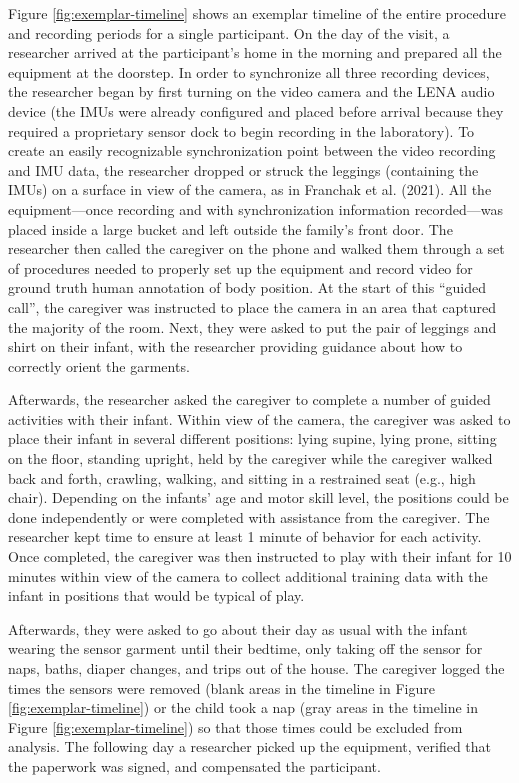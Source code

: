 \documentclass[
  man]{apa6}
\begin{document}
Figure \ref{fig:exemplar-timeline} shows an exemplar timeline of the entire procedure and recording periods for a single participant. On the day of the visit, a researcher arrived at the participant's home in the morning and prepared all the equipment at the doorstep. In order to synchronize all three recording devices, the researcher began by first turning on the video camera and the LENA audio device (the IMUs were already configured and placed before arrival because they required a proprietary sensor dock to begin recording in the laboratory). To create an easily recognizable synchronization point between the video recording and IMU data, the researcher dropped or struck the leggings (containing the IMUs) on a surface in view of the camera, as in Franchak et al. (2021). All the equipment---once recording and with synchronization information recorded---was placed inside a large bucket and left outside the family's front door. The researcher then called the caregiver on the phone and walked them through a set of procedures needed to properly set up the equipment and record video for ground truth human annotation of body position. At the start of this ``guided call'', the caregiver was instructed to place the camera in an area that captured the majority of the room. Next, they were asked to put the pair of leggings and shirt on their infant, with the researcher providing guidance about how to correctly orient the garments.

Afterwards, the researcher asked the caregiver to complete a number of guided activities with their infant. Within view of the camera, the caregiver was asked to place their infant in several different positions: lying supine, lying prone, sitting on the floor, standing upright, held by the caregiver while the caregiver walked back and forth, crawling, walking, and sitting in a restrained seat (e.g., high chair). Depending on the infants' age and motor skill level, the positions could be done independently or were completed with assistance from the caregiver. The researcher kept time to ensure at least 1 minute of behavior for each activity. Once completed, the caregiver was then instructed to play with their infant for 10 minutes within view of the camera to collect additional training data with the infant in positions that would be typical of play.

Afterwards, they were asked to go about their day as usual with the infant wearing the sensor garment until their bedtime, only taking off the sensor for naps, baths, diaper changes, and trips out of the house. The caregiver logged the times the sensors were removed (blank areas in the timeline in Figure \ref{fig:exemplar-timeline}) or the child took a nap (gray areas in the timeline in Figure \ref{fig:exemplar-timeline}) so that those times could be excluded from analysis. The following day a researcher picked up the equipment, verified that the paperwork was signed, and compensated the participant.
\end{document}
